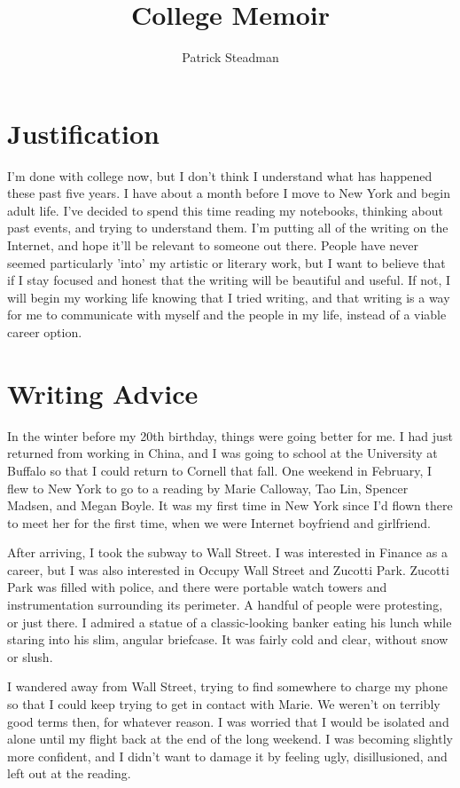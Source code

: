 \documentclass[12pt]{article}
\title{College Memoir}
\author{Patrick Steadman}
\begin{document}
\maketitle

\section{Justification}
I'm done with college now, but I don't think I understand what has happened
these past five years.  I have about a month before I move to New York and begin
adult life.  I've decided to spend this time reading my notebooks, thinking
about past events, and trying to understand them.  I'm putting all of the
writing on the Internet, and hope it'll be relevant to someone out there.
People have never seemed particularly 'into' my artistic or literary work, but I
want to believe that if I stay focused and honest that the writing will be
beautiful and useful.  If not, I will begin my working life knowing that I tried
writing, and that writing is a way for me to communicate with myself and the
people in my life, instead of a viable career option.

\section{Writing Advice}
In the winter before my 20th birthday, things were going better for me.  I had
just returned from working in China, and I was going to school at the University
at Buffalo so that I could return to Cornell that fall.  One weekend in
February, I flew to New York to go to a reading by Marie Calloway, Tao Lin,
Spencer Madsen, and Megan Boyle.  It was my first time in New York since I'd
flown there to meet her for the first time, when we were Internet boyfriend and
girlfriend.  

After arriving, I took the subway to Wall Street.  I was interested in Finance
as a career, but I was also interested in Occupy Wall Street and Zucotti Park.
Zucotti Park was filled with police, and there were portable watch towers and
instrumentation surrounding its perimeter.  A handful of people were protesting,
or just there.  I admired a statue of a classic-looking banker eating his lunch
while staring into his slim, angular briefcase.  It was fairly cold and clear,
without snow or slush.

I wandered away from Wall Street, trying to find somewhere to charge my phone so
that I could keep trying to get in contact with Marie.  We weren't on terribly
good terms then, for whatever reason.  I was worried that I would be isolated
and alone until my flight back at the end of the long weekend.  I was becoming
slightly more confident, and I didn't want to damage it by feeling ugly,
disillusioned, and left out at the reading.
\end{document}
